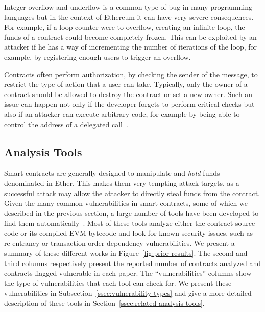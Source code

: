 \point{\integeroverflow~(\vio)}
Integer overflow and underflow is a common type of bug in many programming languages but in the context of Ethereum it can have very severe consequences. For example, if a loop counter were to overflow, creating an infinite loop, the funds of a contract could become completely frozen. This can be exploited by an attacker if he has a way of incrementing the number of iterations of the loop, for example, by registering enough users to trigger an overflow.

\point{\unrestrictedaction~(\vua)}
Contracts often perform authorization, by checking the sender of the message, to restrict the type of action that a user can take.
Typically, only the owner of a contract should be allowed to destroy the contract or set a new owner.
Such an issue can happen not only if the developer forgets to perform critical checks but also if an attacker can execute arbitrary code, for example by being able to control the address of a delegated call~\cite{Krupp2018}.



\subsection{Analysis Tools}
\label{ssec:analysis-tools}
Smart contracts are generally designed to manipulate and \emph{hold} funds denominated in Ether. This makes them very tempting attack targets, as a successful attack may allow the attacker to directly steal funds from the contract. Given the many common vulnerabilities in smart contracts, some of which we described in the previous section, a large number of tools have been developed to find them automatically~\cite{Luu2016a,Tsankov2018,mythril}. Most of these tools analyze either the contract source code or its compiled EVM bytecode and look for known security issues, such as re-entrancy or transaction order dependency vulnerabilities. We present a summary of these different works in Figure~\ref{fig:prior-results}. The second and third columns respectively present the reported number of contracts analyzed and contracts flagged vulnerable in each paper. The ``vulnerabilities'' columns show the type of vulnerabilities that each tool can check for. We present these vulnerabilities in Subsection~\ref{ssec:vulnerability-types} and give a more detailed description of these tools in Section~\ref{ssec:related-analysis-tools}.

